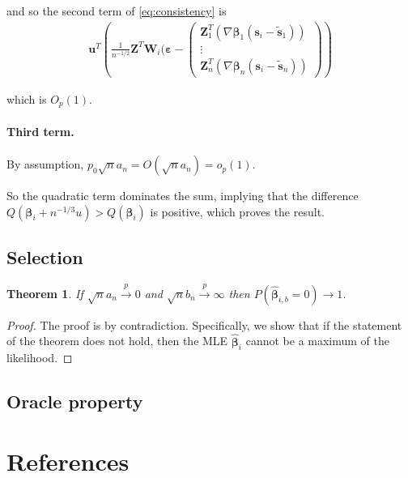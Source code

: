 \documentclass[authoryear, review, 11pt]{elsarticle}
\newtheorem{theorem}{Theorem}[section]
\begin{document}
  and so the second term of \ref{eq:consistency} is
  \begin{align*}
    \bm{u}^T \left( \frac{1}{n^{-1/2}} \bm{Z}^T \bm{W}_i (\bm{\varepsilon} - \left( \begin{array}{c} \bm{Z}_1^T ( \nabla \bm{\beta}_1 (\bm{s}_i - \tilde{\bm{s}}_1) ) \\ \vdots \\ \bm{Z}_n^T ( \nabla \bm{\beta}_n (\bm{s}_i - \tilde{\bm{s}}_n) ) \end{array} \right) \right)
  \end{align*}
  
  which is $O_p(1)$.
  
  \paragraph{Third term.} By assumption, $p_0 \sqrt{n} a_n = O(\sqrt{n} a_n) = o_p(1)$.
  
  So the quadratic term dominates the sum, implying that the difference $Q \left( \bm{\beta}_i + n^{-1/3} u \right) > Q \left( \bm{\beta}_i \right)$ is positive, which proves the result.
  
  \subsection{Selection}
    
    \begin{theorem}    
      If $\sqrt{n} a_n \xrightarrow{p} 0$ and $\sqrt{n} b_n \xrightarrow{p} \infty$ then $P(\hat{\bm{\beta}}_{i,b} = 0) \to 1$.
    \end{theorem}

    \begin{proof}
      The proof is by contradiction. Specifically, we show that if the statement of the theorem does not hold, then the MLE $\hat{\bm{\beta}}_i$ cannot be a maximum of the likelihood.
      
      
    \end{proof}

  \subsection{Oracle property}

\section{References}


\end{document}

